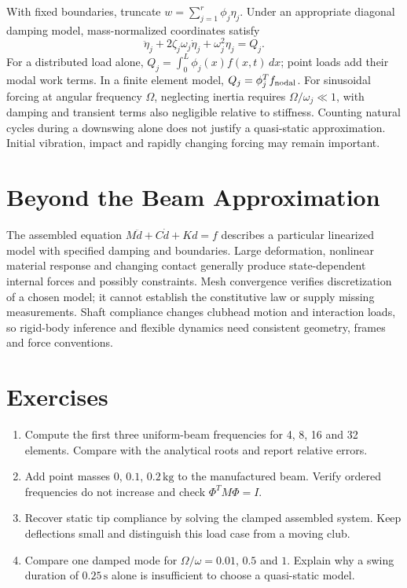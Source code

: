 With fixed boundaries, truncate $w=\sum_{j=1}^r\phi_j\eta_j$. Under an appropriate
diagonal damping model, mass-normalized coordinates satisfy
\begin{equation}
 \ddot\eta_j+2\zeta_j\omega_j\dot\eta_j+\omega_j^2\eta_j=Q_j.
\end{equation}
For a distributed load alone, $Q_j=\int_0^L\phi_j(x)f(x,t)\,dx$; point loads add their modal work terms. In a finite element model, $Q_j=\phi_j^Tf_{\rm nodal}$.
For sinusoidal forcing at angular frequency $\Omega$, neglecting inertia requires
$\Omega/\omega_j\ll1$, with damping and transient terms also negligible relative
to stiffness. Counting natural cycles during a downswing alone does not justify
a quasi-static approximation. Initial vibration, impact and rapidly changing forcing
may remain important.

\section{Beyond the Beam Approximation}
The assembled equation $M\ddot d+C\dot d+Kd=f$ describes a particular linearized
model with specified damping and boundaries. Large deformation, nonlinear material
response and changing contact generally produce state-dependent internal forces
and possibly constraints. Mesh convergence verifies discretization of a chosen
model; it cannot establish the constitutive law or supply missing measurements.
Shaft compliance changes clubhead motion and interaction loads, so rigid-body
inference and flexible dynamics need consistent geometry, frames and force conventions.

\clearpage
\section*{Exercises}
\begin{enumerate}
 \item Compute the first three uniform-beam frequencies for 4, 8, 16 and 32
 elements. Compare with the analytical roots and report relative errors.
 \item Add point masses $0$, $0.1$, $0.2\,\mathrm{kg}$ to the manufactured beam.
 Verify ordered frequencies do not increase and check $\Phi^TM\Phi=I$.
 \item Recover static tip compliance by solving the clamped assembled system.
 Keep deflections small and distinguish this load case from a moving club.
 \item Compare one damped mode for $\Omega/\omega=0.01$, $0.5$ and $1$.
 Explain why a swing duration of $0.25\,\mathrm s$ alone is insufficient
 to choose a quasi-static model.
\end{enumerate}
